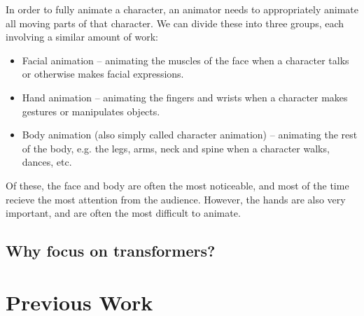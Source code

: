 In order to fully animate a character, an animator needs to appropriately animate all moving parts of that character. We can divide these into three groups, each involving a similar amount of work:
\begin{itemize}
    \item Facial animation -- animating the muscles of the face when a character talks or otherwise makes facial expressions.
    \item Hand animation -- animating the fingers and wrists when a character makes gestures or manipulates objects.
    \item Body animation (also simply called character animation) -- animating the rest of the body, e.g. the legs, arms, neck and spine when a character walks, dances, etc.
\end{itemize}

Of these, the face and body are often the most noticeable, and most of the time recieve the most attention from the audience. However, the hands are also very important, and are often the most difficult to animate.


\subsection{Why focus on transformers?}
\label{ss:why-transformers}


\section{Previous Work}
